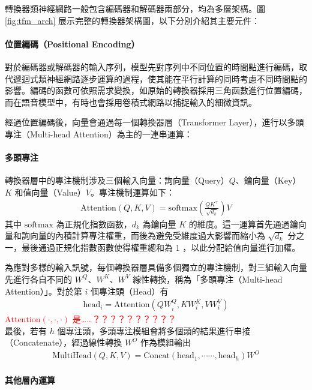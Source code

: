 轉換器類神經網路一般包含編碼器和解碼器兩部分，均為多層架構。圖 \ref{fig:tfm_arch} 展示完整的轉換器架構圖，以下分別介紹其主要元件：

\paragraph{位置編碼（Positional Encoding）}

對於編碼器或解碼器的輸入序列，模型先對序列中不同位置的時間點進行編碼，取代遞迴式類神經網路逐步運算的過程，使其能在平行計算的同時考慮不同時間點的影響。編碼的函數可依照需求變換，如原始的轉換器採用三角函數進行位置編碼，而在語音模型中，有時也會採用卷積式網路以捕捉輸入的細微資訊。

經過位置編碼後，向量會通過每一個轉換器層（Transformer Layer），進行以多頭專注（Multi-head Attention）為主的一連串運算：

\paragraph{多頭專注}

轉換器層中的專注機制涉及三個輸入向量：詢向量（Query）$Q$、鑰向量（Key）$K$ 和值向量（Value）$V$。專注機制運算如下：
\begin{align}
    \text{Attention}(Q, K, V) = \text{softmax}
    \left(
    \frac{QK^\top}{\sqrt{d_k}}
    \right)
    V
\end{align}
其中 $\text{softmax}$ 為正規化指數函數，$d_k$ 為鑰向量 $K$ 的維度。這一運算首先通過鑰向量和詢向量的內積計算專注權重，而後為避免受維度過大影響而縮小為 $\sqrt{d_k}$ 分之一，最後通過正規化指數函數使得權重總和為 1 ，以此分配給值向量進行加權。

為應對多樣的輸入訊號，每個轉換器層具備多個獨立的專注機制，對三組輸入向量先進行各自不同的 $W^Q$、$W^K$、$W^V$ 線性轉換，稱為「多頭專注（Multi-head Attention）」。對於第 $i$ 個專注頭（Head）有
\begin{align}
    \text{head}_i = \text{Attention}(QW^Q_i,KW^K_i,VW^V_i)
\end{align}
          \textcolor{red}{\(\text{Attention}(\cdot, \cdot, \cdot)\) 是……？？？？？？？？？？} \\
最後，若有 $h$ 個專注頭，多頭專注模組會將多個頭的結果進行串接（Concatenate），經過線性轉換 $W^O$ 作為模組輸出
\begin{align}
    \text{MultiHead}(Q, K, V) = \text{Concat}(\text{head}_1, \cdots\cdots, \text{head}_h) W^O
\end{align}

\paragraph{其他層內運算}

